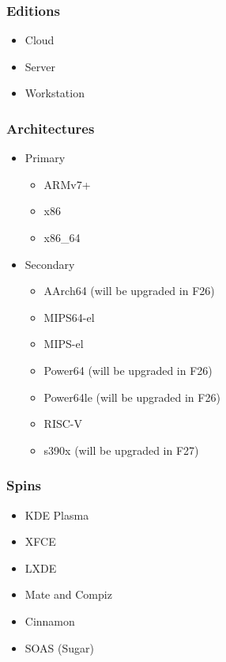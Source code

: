 \documentclass[t,aspectratio=169]{beamer}
\begin{document}
\begin{frame}
    \frametitle{Editions}
    \begin{itemize}
        \item<2-> Cloud
        \item<3-> Server
        \item<4-> Workstation
    \end{itemize}
\end{frame}

\begin{frame}
    \frametitle{Architectures}
    \begin{itemize}
        \item<2-> Primary
        \begin{itemize}
            \item<3-> ARMv7+
            \item<4-> x86
            \item<5-> x86\_64
        \end{itemize}
        \item<6-> Secondary
        \begin{itemize}
            \item<6-> AArch64 (will be upgraded in F26)
            \item<6-> MIPS64-el
            \item<6-> MIPS-el
            \item<6-> Power64 (will be upgraded in F26)
            \item<6-> Power64le (will be upgraded in F26)
            \item<6-> RISC-V
            \item<6-> s390x (will be upgraded in F27)
        \end{itemize}
    \end{itemize}
\end{frame}

\begin{frame}
    \frametitle{Spins}
    \begin{itemize}
        \item KDE Plasma
        \item XFCE
        \item LXDE
        \item Mate and Compiz
        \item Cinnamon
        \item SOAS (Sugar)
    \end{itemize}
\end{frame}
\end{document}
